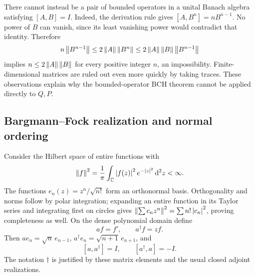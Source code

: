 There cannot instead be a pair of bounded operators in a unital Banach algebra satisfying $[A,B]=I$. Indeed, the derivation rule gives $[A,B^n]=nB^{n-1}$. No power of $B$ can vanish, since its least vanishing power would contradict that identity. Therefore
\begin{equation}
 n\left\lVert B^{n-1}\right\rVert\leq2\left\lVert A\right\rVert\left\lVert B^n\right\rVert
 \leq2\left\lVert A\right\rVert\left\lVert B\right\rVert\left\lVert B^{n-1}\right\rVert
\end{equation}
implies $n\leq2\left\lVert A\right\rVert\left\lVert B\right\rVert$ for every positive integer $n$, an impossibility. Finite-dimensional matrices are ruled out even more quickly by taking traces. These observations explain why the bounded-operator BCH theorem cannot be applied directly to $Q,P$.

\subsection{Bargmann--Fock realization and normal ordering}
Consider the Hilbert space of entire functions with
\begin{equation}
 \left\lVert f\right\rVert^2=\frac1\pi\int_{\mathbb C}\left\lvert f(z)\right\rvert^2e^{-\left\lvert z\right\rvert^2}\,\mathrm d^2z<\infty.
\end{equation}
The functions $e_n(z)=z^n/\sqrt{n!}$ form an orthonormal basis. Orthogonality and norms follow by polar integration; expanding an entire function in its Taylor series and integrating first on circles gives
$\left\lVert \sum c_nz^n\right\rVert^2=\sum n!\left\lvert c_n\right\rvert^2$, proving completeness as well.
On the dense polynomial domain define
\begin{equation}
 af=f',\qquad a^\dagger f=zf.
\end{equation}
Then $ae_n=\sqrt n\,e_{n-1}$, $a^\dagger e_n=\sqrt{n+1}\,e_{n+1}$, and
\begin{equation}\label{eq:ladder-CCR}
 [a,a^\dagger]=I,\qquad [a^\dagger,a]=-I.
\end{equation}
The notation $\dagger$ is justified by these matrix elements and the usual closed adjoint realizations.

